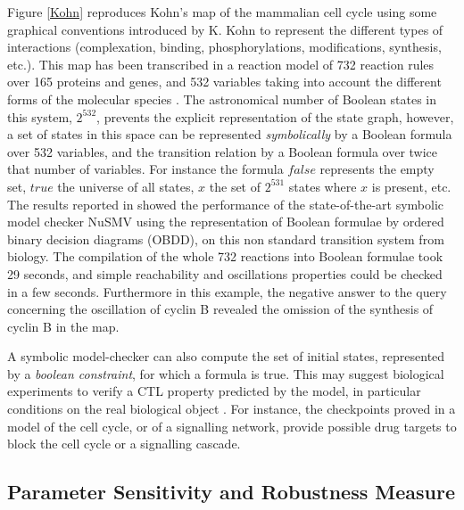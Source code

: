 \documentclass[graybox]{svmult}
\def\Rlin{\mathbb{R_{\mbox{lin}}}}
\def\true{\mathit{true}}
\def\false{\mathit{false}}
\begin{document}
Figure \ref{Kohn} reproduces Kohn's map of the mammalian cell cycle \cite{Kohn99mbc}
using some graphical conventions introduced by K. Kohn to represent the different types of interactions
(complexation, binding, phosphorylations, modifications, synthesis, etc.).
This map has been transcribed in a reaction model of 732 reaction rules
over 165 proteins and genes, and 532 variables taking into account the different forms
of the molecular species \cite{CCDFS04tcs}.
The astronomical number of Boolean states in this system, $2^{532}$,
prevents the explicit representation of the state graph,
however, a set of states in this space can be represented \emph{symbolically}
by a Boolean formula over 532 variables,
and the transition relation by a Boolean formula over twice that number of variables.
For instance the formula $\false$ represents the empty set, $\true$ the universe of all states, 
$x$ the set of $2^{531}$ states where $x$ is present, etc.
The results reported in \cite{CCDFS04tcs} showed the performance of the state-of-the-art symbolic model checker NuSMV \cite{CCGGPRST02cav}
using the representation of Boolean formulae by ordered binary decision diagrams (OBDD),
on this non standard transition system from biology.
The compilation of the whole 732 reactions into Boolean formulae took 29 seconds,
and simple reachability and oscillations properties could be checked in a few seconds.
Furthermore in this example, the negative answer to the query concerning the oscillation of cyclin B
revealed the omission of the synthesis of cyclin B in the map.


A symbolic model-checker can also compute the set of initial states, represented by a \emph{boolean constraint}, for which a formula is true.
This  may suggest biological experiments to verify a CTL property predicted by the model,
in particular conditions on the real biological object \cite{BCRG04jtb}.
For instance, the checkpoints proved in a model of the cell cycle, or of a signalling network, 
provide possible drug targets to block the cell cycle or a signalling cascade.


\subsection{Parameter Sensitivity and Robustness Measure}\label{sens} %
\end{document}
